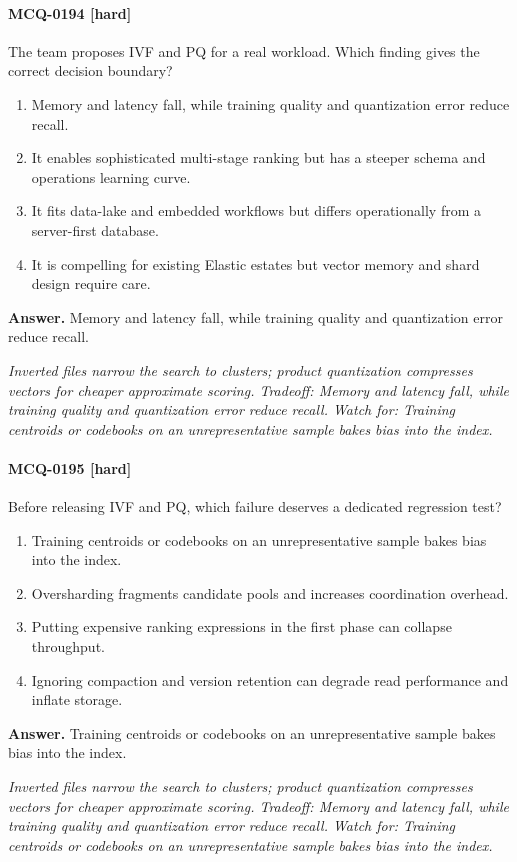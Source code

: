 \paragraph{MCQ-0194 [hard]} The team proposes IVF and PQ for a real workload. Which finding gives the correct decision boundary?
\begin{enumerate}[label=\Alph*.]
\item Memory and latency fall, while training quality and quantization error reduce recall.
\item It enables sophisticated multi-stage ranking but has a steeper schema and operations learning curve.
\item It fits data-lake and embedded workflows but differs operationally from a server-first database.
\item It is compelling for existing Elastic estates but vector memory and shard design require care.
\end{enumerate}
\noindent\textbf{Answer.} Memory and latency fall, while training quality and quantization error reduce recall.
\par\textit{Inverted files narrow the search to clusters; product quantization compresses vectors for cheaper approximate scoring. Tradeoff: Memory and latency fall, while training quality and quantization error reduce recall. Watch for: Training centroids or codebooks on an unrepresentative sample bakes bias into the index.}
\paragraph{MCQ-0195 [hard]} Before releasing IVF and PQ, which failure deserves a dedicated regression test?
\begin{enumerate}[label=\Alph*.]
\item Training centroids or codebooks on an unrepresentative sample bakes bias into the index.
\item Oversharding fragments candidate pools and increases coordination overhead.
\item Putting expensive ranking expressions in the first phase can collapse throughput.
\item Ignoring compaction and version retention can degrade read performance and inflate storage.
\end{enumerate}
\noindent\textbf{Answer.} Training centroids or codebooks on an unrepresentative sample bakes bias into the index.
\par\textit{Inverted files narrow the search to clusters; product quantization compresses vectors for cheaper approximate scoring. Tradeoff: Memory and latency fall, while training quality and quantization error reduce recall. Watch for: Training centroids or codebooks on an unrepresentative sample bakes bias into the index.}
